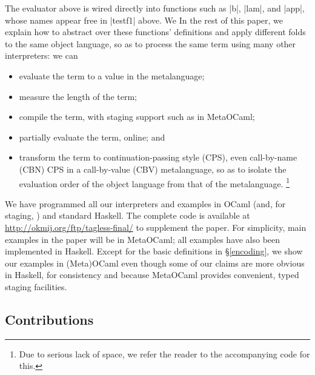 The evaluator above is wired directly into
functions such as |b|, |lam|, and |app|, whose names appear
free in |testf1| above.
\ifshort We \else In the rest of this paper, we \fi
explain how to abstract over these functions' definitions
and apply different folds to the same object language, so as
to process the same term using many other
interpreters: we can
\begin{itemize}
    \item evaluate the term to a value in the metalanguage;
    \item measure the length of the term;
    \item compile the term, with staging support such as in MetaOCaml;
    \item partially evaluate the term, online; and
    \item transform the term to continuation\hyp passing style (CPS),
        even call-by-name (CBN) CPS in a call-by-value (CBV) metalanguage,
        so as to isolate the evaluation
        order of the object language from that of the metalanguage.\ifshort
\footnote{Due to serious lack of space, 
we refer the reader to the accompanying code for this.}\fi
\end{itemize}
We have programmed all our interpreters and examples in OCaml (and, for staging,
\citet{metaocaml}) and standard Haskell. The complete code is
available at \url{http://okmij.org/ftp/tagless-final/}
to supplement the paper. 
\ifshort For simplicity, main examples in the paper will be in MetaOCaml;
all examples have also been implemented in Haskell.
\else Except for the basic definitions in \S\ref{encoding},
we show our examples in (Meta)OCaml even though some of our
claims are more obvious in Haskell, for consistency and because
MetaOCaml provides convenient, typed staging facilities.
\fi

\subsection{Contributions}\label{contributions}

